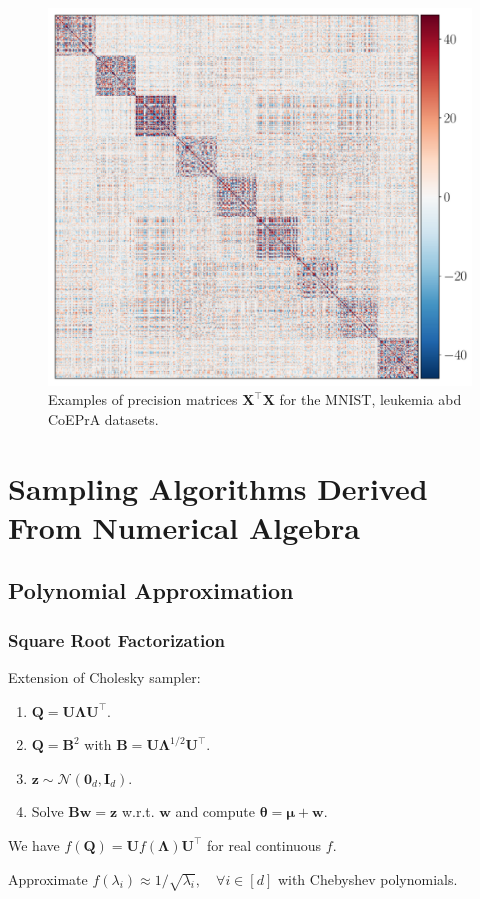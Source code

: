 \documentclass[aspectratio=169]{beamer}
\newcommand{\B}[1]{\mathbf{#1}} %
\newcommand{\Bs}[1]{\boldsymbol{#1}} %
\begin{document}
\begin{frame}
\begin{figure}
    \mbox{{\includegraphics[scale=0.15]{src/images/Coepra_AA.pdf}}}
    \caption{Examples of precision matrices $\B{X}^{\top}\B{X}$ for the MNIST, leukemia abd CoEPrA datasets.}
    \label{fig:LASSO_example}
\end{figure}
\end{frame}

\section{Sampling Algorithms Derived From Numerical Algebra}
\subsection{Polynomial Approximation}
\begin{frame}
\frametitle{Square Root Factorization}
Extension of Cholesky sampler:
\begin{enumerate}
    \item $\B{Q} = \B{U}\B{\Lambda}\B{U^{\top}}$. 
    \item $\B{Q} = \B{B}^2$ with $\B{B} = \B{U}\B{\Lambda}^{1/2}\B{U^{\top}}$.\item $\B{z} \sim \mathcal{N}(\B{0}_d,\B{I}_d)$.
    \item Solve $\B{B}\B{w} = \B{z}$ w.r.t. $\B{w}$ and compute $\Bs{\theta} = \Bs{\mu} + \B{w}$.
\end{enumerate}
We have $f(\B{Q}) = \B{U}f(\B{\Lambda})\B{U}^{\top}$ for real continuous \(f\).

Approximate \(f(\lambda_i) \approx 1/\sqrt{\lambda_i}, \quad \forall i \in [d]\) with Chebyshev polynomials.
\end{frame}
\end{document}
